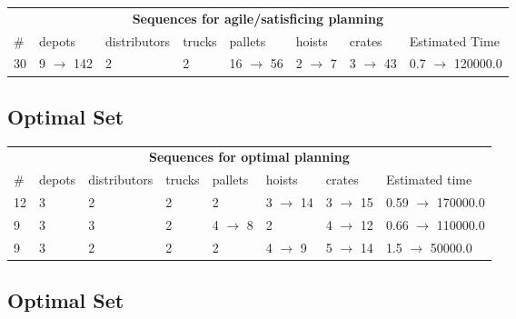\documentclass{article}
\begin{document}
                        \begin{center}
                        \begin{tabular}{l|l|l|l|l|l|l|l}
                        \multicolumn{8}{c}{\bf \large Sequences for agile/satisficing planning}\\
                        \# & depots & distributors & trucks & pallets & hoists & crates & Estimated Time\\\midrule
                        30&9 $\rightarrow$ 142&2&2&16 $\rightarrow$ 56&2 $\rightarrow$ 7&3 $\rightarrow$ 43&0.7 $\rightarrow$ 120000.0
                        \end{tabular}
                        \end{center}
                    
                            \subsection*{Optimal Set}

                            \begin{center}
                            \begin{tabular}{l|l|l|l|l|l|l|l}
                            \multicolumn{8}{c}{\bf \large Sequences for optimal planning}\\
                            \# & depots & distributors & trucks & pallets & hoists & crates & Estimated time\\\midrule
                            12&3&2&2&2&3 $\rightarrow$ 14&3 $\rightarrow$ 15&0.59 $\rightarrow$ 170000.0\\
9&3&3&2&4 $\rightarrow$ 8&2&4 $\rightarrow$ 12&0.66 $\rightarrow$ 110000.0\\
9&3&2&2&2&4 $\rightarrow$ 9&5 $\rightarrow$ 14&1.5 $\rightarrow$ 50000.0
                            \end{tabular}
                            \end{center}
                    
                                \subsection*{Optimal Set}
                                
\end{document}
